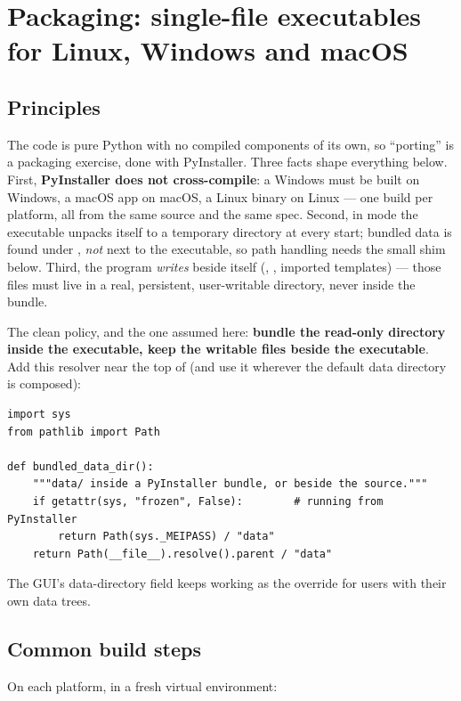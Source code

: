 \section{Packaging: single-file executables for Linux, Windows and macOS}
\label{sec:packaging}

\subsection{Principles}

The code is pure Python with no compiled components of its own, so
``porting'' is a packaging exercise, done with PyInstaller. Three facts
shape everything below. First, \textbf{PyInstaller does not
cross-compile}: a Windows  must be built on Windows, a macOS
app on macOS, a Linux binary on Linux --- one build per platform, all
from the same source and the same spec. Second, in  mode
the executable unpacks itself to a temporary directory at every start;
bundled data is found under , \emph{not} next to the
executable, so path handling needs the small shim below. Third, the
program \emph{writes} beside itself (,
, imported templates) --- those files must live in
a real, persistent, user-writable directory, never inside the bundle.

The clean policy, and the one assumed here: \textbf{bundle the read-only
 directory inside the executable, keep the writable files
beside the executable}. Add this resolver near the top of
 (and use it wherever the default data directory is
composed):

\begin{verbatim}
import sys
from pathlib import Path

def bundled_data_dir():
    """data/ inside a PyInstaller bundle, or beside the source."""
    if getattr(sys, "frozen", False):        # running from PyInstaller
        return Path(sys._MEIPASS) / "data"
    return Path(__file__).resolve().parent / "data"
\end{verbatim}

The GUI's data-directory field keeps working as the override for users
with their own data trees.

\subsection{Common build steps}

On each platform, in a fresh virtual environment:

